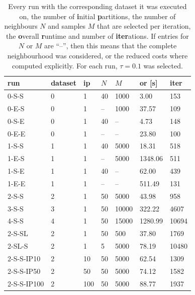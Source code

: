 \begin{table}
    \begin{tabular}{lllll|ll}
        run & dataset & {\bf ip} & $N$ & $M$ & {\bf or} [s] & {\bf iter} \\
        \hline 
        0-S-S  & 0 & 1 & 40 &  1000       & 3.00 & 153      \\    
        0-E-S  & 0 & 1 & -- &  1000       & 37.57 & 109     \\    
        0-S-E  & 0 & 1 & 40 &  --         & 4.73 & 148      \\    
        0-E-E  & 0 & 1 & -- &  --         & 23.80 & 100     \\   
        \hline 
        1-S-S  & 1 & 1 & 40 &  5000       & 18.31 & 518     \\    
        1-E-S  & 1 & 1 & -- &  5000       & 1348.06 & 511   \\    
        1-S-E  & 1 & 1 & 40 &  --         & 62.00 & 439     \\    
        1-E-E  & 1 & 1 & -- &  --         & 511.49 & 131    \\    
        \hline
        2-S-S  & 2 & 1 & 50 &  5000       & 43.98 & 958     \\    
        3-S-S  & 3 & 1 & 50 & 10000       & 322.22 & 4607   \\    
        4-S-S  & 4 & 1 & 50 & 15000       & 1280.99 & 10694 \\    
        \hline
        2-S-SL & 2 & 1 & 50 &   500       & 37.80 & 1769    \\    
        2-SL-S & 2 & 1 &  5 &  5000       & 78.19 & 10480   \\    
        \hline
        2-S-S-IP10  & 2 &  10 & 50 & 5000 & 62.54 & 1309    \\
        2-S-S-IP50  & 2 &  50 & 50 & 5000 & 74.12 & 1582    \\
        2-S-S-IP100 & 2 & 100 & 50 & 5000 & 88.77 & 1937    \\
    \end{tabular}
    \caption{Every run with the corresponding dataset it was executed on, the number of {\bf i}nitial {\bf p}artitions, the number of neighbours $N$ and samples $M$ that are selected per iteration, the {\bf o}verall {\bf r}untime and number of {\bf iter}ations. If entries for $N$ or $M$ are ``--'', then this means that the complete neighbourhood was considered, or the reduced costs where computed explicitly. For each run, $\tau = 0.1$ was selected.} \label{tab:data}
\end{table}

